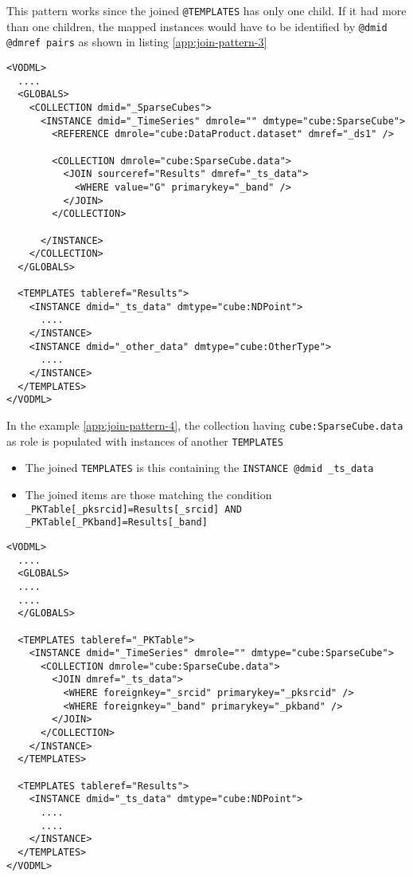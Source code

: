 This pattern works since the joined \texttt{@TEMPLATES} has only one child. 
If it had more than one children, the mapped instances would have to be identified by  \texttt{@dmid \texttt{@dmref} pairs} as shown in listing \ref{app:join-pattern-3}

\begin{lstlisting}[frame=single,label={app:join-pattern-3},caption={Joining a \texttt{TEMPLATES} with a global \texttt{COLLECTION} identified by both \texttt{@sourceref} and \texttt{@dmid} \texttt{@dmref} pairs},style=XML,basicstyle=\tiny]
<VODML>
  ....
  <GLOBALS>
    <COLLECTION dmid="_SparseCubes">
      <INSTANCE dmid="_TimeSeries" dmrole="" dmtype="cube:SparseCube">
        <REFERENCE dmrole="cube:DataProduct.dataset" dmref="_ds1" />
        
        <COLLECTION dmrole="cube:SparseCube.data">
          <JOIN sourceref="Results" dmref="_ts_data">
            <WHERE value="G" primarykey="_band" />
          </JOIN>
        </COLLECTION>
        
      </INSTANCE>
    </COLLECTION>
  </GLOBALS>

  <TEMPLATES tableref="Results">
    <INSTANCE dmid="_ts_data" dmtype="cube:NDPoint">
      ....
    </INSTANCE>
    <INSTANCE dmid="_other_data" dmtype="cube:OtherType">
      ....
    </INSTANCE>
  </TEMPLATES>
</VODML>
\end{lstlisting}  

In the example \ref{app:join-pattern-4}, the collection having \texttt{cube:SparseCube.data} as role is populated with  instances of another \texttt{TEMPLATES}
\begin{itemize}
  \item The joined \texttt{TEMPLATES} is this containing the  \texttt{INSTANCE \texttt{@dmid} \_ts\_data}
  \item The joined items are those matching the condition  \texttt{\_PKTable[\_pksrcid]=Results[\_srcid] AND  \_PKTable[\_PKband]=Results[\_band]}
\end{itemize}


\begin{lstlisting}[frame=single,label={app:join-pattern-4},caption={Joining two \texttt{TEMPLATES} together with \texttt{@dmid} \texttt{@dmref} pairs},style=XML,basicstyle=\tiny]
<VODML>
  ....
  <GLOBALS>
  ....
  ....
  </GLOBALS>

  <TEMPLATES tableref="_PKTable">
    <INSTANCE dmid="_TimeSeries" dmrole="" dmtype="cube:SparseCube">
      <COLLECTION dmrole="cube:SparseCube.data">
        <JOIN dmref="_ts_data">
          <WHERE foreignkey="_srcid" primarykey="_pksrcid" />
          <WHERE foreignkey="_band" primarykey="_pkband" />
        </JOIN>
      </COLLECTION>
    </INSTANCE>
  </TEMPLATES>

  <TEMPLATES tableref="Results">
    <INSTANCE dmid="_ts_data" dmtype="cube:NDPoint">
      ....
      ....
    </INSTANCE>
  </TEMPLATES>
</VODML>
\end{lstlisting}  


